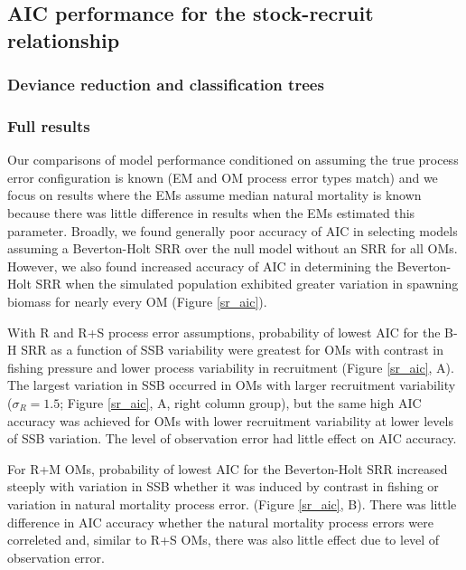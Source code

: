 \documentclass[
  12pt,
]{article}
\begin{document}
\hypertarget{aic-performance-for-the-stock-recruit-relationship}{%
\subsection*{AIC performance for the stock-recruit
relationship}\label{aic-performance-for-the-stock-recruit-relationship}}

\hypertarget{deviance-reduction-and-classification-trees-2}{%
\subsubsection*{Deviance reduction and classification
trees}\label{deviance-reduction-and-classification-trees-2}}

\hypertarget{full-results-2}{%
\subsubsection*{Full results}\label{full-results-2}}

Our comparisons of model performance conditioned on assuming the true
process error configuration is known (EM and OM process error types
match) and we focus on results where the EMs assume median natural
mortality is known because there was little difference in results when
the EMs estimated this parameter. Broadly, we found generally poor
accuracy of AIC in selecting models assuming a Beverton-Holt SRR over
the null model without an SRR for all OMs. However, we also found
increased accuracy of AIC in determining the Beverton-Holt SRR when the
simulated population exhibited greater variation in spawning biomass for
nearly every OM (Figure \ref{sr_aic}).

With R and R+S process error assumptions, probability of lowest AIC for
the B-H SRR as a function of SSB variability were greatest for OMs with
contrast in fishing pressure and lower process variability in
recruitment (Figure \ref{sr_aic}, A). The largest variation in SSB
occurred in OMs with larger recruitment variability (\(\sigma_R = 1.5\);
Figure \ref{sr_aic}, A, right column group), but the same high AIC
accuracy was achieved for OMs with lower recruitment variability at
lower levels of SSB variation. The level of observation error had little
effect on AIC accuracy.

For R+M OMs, probability of lowest AIC for the Beverton-Holt SRR
increased steeply with variation in SSB whether it was induced by
contrast in fishing or variation in natural mortality process error.
(Figure \ref{sr_aic}, B). There was little difference in AIC accuracy
whether the natural mortality process errors were correleted and,
similar to R+S OMs, there was also little effect due to level of
observation error.
\end{document}
